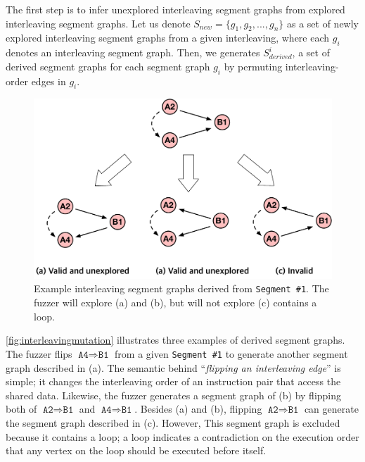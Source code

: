 %
The first step is to infer unexplored interleaving segment graphs from
explored interleaving segment graphs.
%
Let us denote $S_{new} = \{g_1, g_2, ..., g_n \}$ as a set of newly
explored interleaving segment graphs from a given interleaving, where
each $g_i$ denotes an interleaving segment graph.
%
Then, we generates $S^{i}_{derived}$, a set of derived segment graphs
for each segment graph $g_i$ by permuting interleaving-order edges in
$g_i$.



\begin{figure}[t]
  \centering
  \includegraphics[width=0.9\linewidth]{fig/interleavingmutation.pdf}
  \caption{Example interleaving segment graphs derived from
    \texttt{Segment \#1}. The fuzzer will explore (a) and (b), but
    will not explore (c) contains a loop.}
  \label{fig:interleavingmutation}
\end{figure}
%

\autoref{fig:interleavingmutation} illustrates three examples of
derived segment graphs.
%
The fuzzer flips $\texttt{A4} \Rightarrow \texttt{B1}$ from a given
\texttt{Segment \#1} to generate another segment graph described in
(a).
%
The semantic behind ``\textit{flipping an interleaving edge}'' is
simple; it changes the interleaving order of an instruction pair that
access the shared data.
%
Likewise, the fuzzer generates a segment graph of (b) by flipping both
of $\texttt{A2} \Rightarrow \texttt{B1}$ and
$\texttt{A4} \Rightarrow \texttt{B1}$.
%
Besides (a) and (b), flipping $\texttt{A2} \Rightarrow \texttt{B1}$
can generate the segment graph described in (c). However, This segment
graph is excluded because it contains a loop; a loop indicates a
contradiction on the execution order that any vertex on the loop
should be executed before itself.




